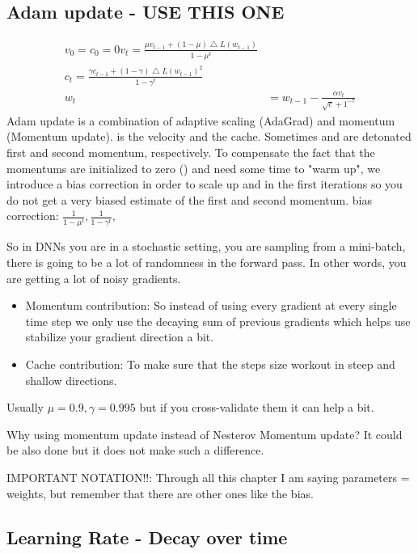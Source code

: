 \subsection*{Adam update - USE THIS ONE}
\begin{equation}
\begin{aligned}
v_0 = c_0 = 0
v_t = \frac{\mu v_{t-1} + (1-\mu)\bigtriangleup L (w_{t-1})}{1 - \mu^t} \\
c_t = \frac{\gamma c_{t-1} + (1-\gamma)\bigtriangleup L (w_{t-1})^2}{1 - \gamma^t} \\
w_t &= w_{t-1} - \frac{\alpha v_t}{\sqrt{c} + 1^{-7}}
\end{aligned}
\end{equation}
Adam update is a combination of adaptive scaling (AdaGrad) and momentum (Momentum update).  is the velocity and  the cache. Sometimes  and   are detonated first and second momentum, respectively. To compensate the fact that the momentums are initialized to zero () and need some time to "warm up", we introduce a bias correction in order to scale up  and  in the first iterations so you do not get a very biased estimate of the first and second momentum.
bias correction: $ \frac{1}{1 - \mu^t}, \frac{1}{1 - \gamma^t},$


So in DNNs you are in a stochastic setting, you are sampling from a mini-batch, there is going to be a lot of randomness in the forward pass. In other words, you are getting a lot of noisy gradients.

\begin{itemize}
\item Momentum contribution: So instead of using every gradient at every single time step we only use the decaying sum of previous gradients which helps use stabilize your gradient direction a bit.
\item Cache contribution: To make sure that  the steps size workout in steep and shallow directions.
\end{itemize}

Usually $\mu = 0.9, \gamma = 0.995$ but if you cross-validate them it can help a bit.

Why using momentum update instead of Nesterov Momentum update? It could be also done but it does not make such a difference.

IMPORTANT NOTATION!!: Through all this chapter I am saying parameters = weights, but remember that there are other ones like the bias.


\subsection*{Learning Rate - Decay over time}

